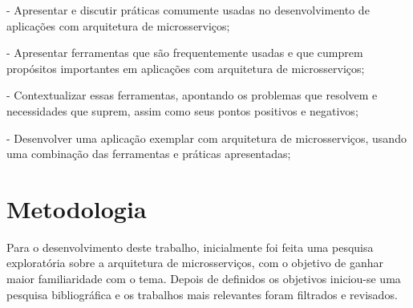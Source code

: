 - Apresentar e discutir práticas comumente usadas no desenvolvimento de aplicações com arquitetura de microsserviços;






- Apresentar ferramentas que são frequentemente usadas e que cumprem propósitos importantes em aplicações com arquitetura de microsserviços;

- Contextualizar essas ferramentas, apontando os problemas que resolvem e necessidades que suprem, assim como seus pontos positivos e negativos;

- Desenvolver uma aplicação exemplar com arquitetura de microsserviços, usando uma combinação das ferramentas e práticas apresentadas;



\section{Metodologia}

Para o desenvolvimento deste trabalho, inicialmente foi feita uma pesquisa exploratória sobre a arquitetura de microsserviços, com o objetivo de ganhar maior familiaridade com o tema. Depois de definidos os objetivos iniciou-se uma pesquisa bibliográfica e os trabalhos mais relevantes foram filtrados e revisados. 


